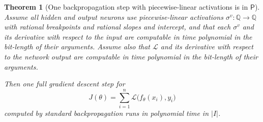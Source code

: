 \documentclass{article}
\newcommand{\cL}{\mathcal{L}}
\theoremstyle{plain}
\newtheorem{theorem}{Theorem}[section]
\theoremstyle{definition}
\theoremstyle{remark}
\begin{document}
\begin{theorem}[One backpropagation step with piecewise-linear activations is in $\mathsf{P}$]
	Assume all hidden and output neurons use piecewise-linear activations
	$\sigma^v:\mathbb{Q}\to\mathbb{Q}$ with rational breakpoints and rational
	slopes and intercept, and that
	each $\sigma^v$ and its derivative with respect to the input are
	computable in time polynomial in the bit-length of their arguments.  Assume
	also that $\cL$ and its derivative with respect to the network output are
	computable in time polynomial in the bit-length of their arguments.
	
	Then one full gradient descent step for
	\[
	J(\theta)=\sum_{i=1}^n \cL\bigl(f_\theta(x_i),y_i\bigr)
	\]
	computed by standard backpropagation runs in polynomial time in $|I|$.
\end{theorem}
\end{document}
